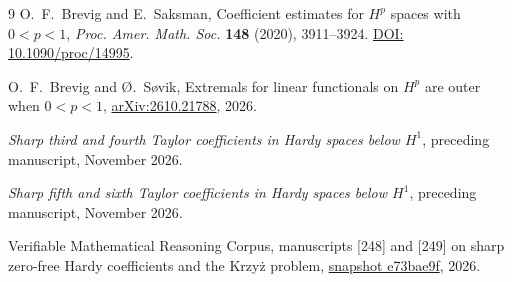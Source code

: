 \documentclass[11pt]{article}
\begin{document}
\enlargethispage{\baselineskip}
\small
\begin{thebibliography}{9}
\setlength{\itemsep}{2pt}
O.~F.~Brevig and E.~Saksman, Coefficient estimates for \(H^p\)
spaces with \(0<p<1\), \emph{Proc. Amer. Math. Soc.} \textbf{148}
(2020), 3911--3924.
\href{https://doi.org/10.1090/proc/14995}{DOI: 10.1090/proc/14995}.

O.~F.~Brevig and \O.~S{\o}vik, Extremals for linear functionals on
\(H^p\) are outer when \(0<p<1\),
\href{https://arxiv.org/abs/2610.21788}{arXiv:2610.21788}, 2026.

\emph{Sharp third and fourth Taylor coefficients in Hardy spaces
below \(H^1\)}, preceding manuscript, November 2026.

\emph{Sharp fifth and sixth Taylor coefficients in Hardy spaces
below \(H^1\)}, preceding manuscript, November 2026.

Verifiable Mathematical Reasoning Corpus, manuscripts [248] and
[249] on sharp zero-free Hardy coefficients and the Krzy\.z problem,
\href{https://github.com/QEEDDD/Verifiable-Mathematical-Reasoning-Corpus/tree/e73bae9fd0c319129b19aacc5c317f7abf2865ef}{snapshot e73bae9f},
2026.
\end{thebibliography}
\end{document}

